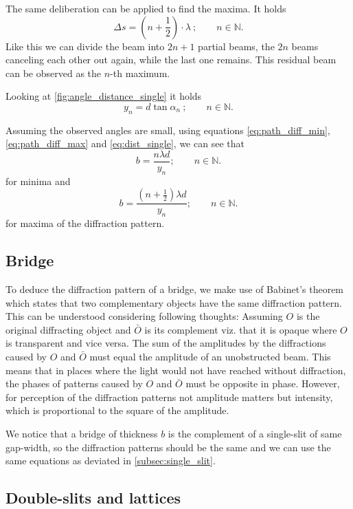 The same deliberation can be applied to find the maxima.
It holds
\begin{equation}\label{eq:path_diff_max}
	\Delta s = \left(n+\frac{1}{2}\right)\cdot\lambda\ ;\qquad n\in\mathbb{N}.
\end{equation}
Like this we can divide the beam into $2n+1$ partial beams, the $2n$ beams canceling each other out again, while the last one remains.
This residual beam can be observed as the $n$-th maximum.

Looking at \autoref{fig:angle_distance_single} it holds
\begin{equation}\label{eq:dist_single}
	y_n = d\tan\alpha_n\ ;\qquad n\in\mathbb{N}.
\end{equation}

Assuming the observed angles are small, using equations \ref{eq:path_diff_min}, \ref{eq:path_diff_max} and \ref{eq:dist_single}, we can see that
\begin{equation}\label{eq:single_slit_minima}
	b = \frac{n\lambda d}{y_n} ;\qquad n\in\mathbb{N}.
\end{equation}
for minima and
\begin{equation}\label{eq:single_slit_maxima}
	b = \frac{\left(n+\frac{1}{2}\right)\lambda d}{y_n} ;\qquad n\in\mathbb{N}.
\end{equation}
for maxima of the diffraction pattern.

\subsection{Bridge}
To deduce the diffraction pattern of a bridge, we make use of Babinet's theorem which states that two complementary objects have the same diffraction pattern.
This can be understood considering following thoughts:
Assuming $O$ is the original diffracting object and $\bar{O}$ is its complement viz. that it is opaque where $O$ is transparent and vice versa.
The sum of the amplitudes by the diffractions caused by $O$ and $\bar{O}$ must equal the amplitude of an unobstructed beam.
This means that in places where the light would not have reached without diffraction, the phases of patterns caused by $O$ and $\bar{O}$ must be opposite in phase.
However, for perception of the diffraction patterns not amplitude matters but intensity, which is proportional to the square of the amplitude.

We notice that a bridge of thickness $b$ is the complement of a single-slit of same gap-width, so the diffraction patterns should be the same and we can use the same equations as deviated in \autoref{subsec:single_slit}.

\subsection{Double-slits and lattices}
